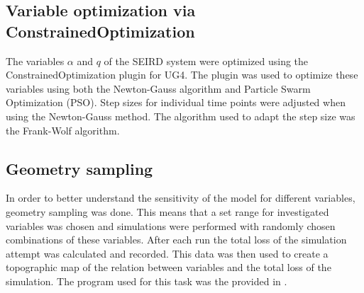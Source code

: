 \subsection{Variable optimization via ConstrainedOptimization}
The variables $\alpha$ and $q$ of the SEIRD system were optimized using the ConstrainedOptimization plugin for UG4\cite{???}.
The plugin was used to optimize these variables using both the Newton-Gauss algorithm and Particle Swarm Optimization (PSO). Step sizes for
individual time points were adjusted when using the Newton-Gauss method. The algorithm used to adapt the step size was the Frank-Wolf
algorithm\cite{devansh}\cite{frank-wolf}. %


\subsection{Geometry sampling}
In order to better understand the sensitivity of the model for different variables, geometry sampling was done. This means that a set range for
investigated variables was chosen and simulations were performed with randomly chosen combinations of these variables. After each run the total
loss of the simulation attempt was calculated and recorded. This data was then used to create a topographic map of the relation between variables
and the total loss of the simulation. The program used for this task was the  provided in .

